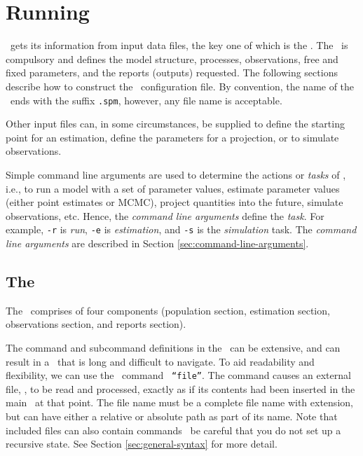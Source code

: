 \section{Running \SPM\label{sec:running-spm}}

\SPM\ gets its information from input data files, the key one of which is the \config{}. The \config\ is compulsory and defines the model structure, processes, observations, free and fixed parameters, and the reports (outputs) requested. The following sections  describe how to construct the \SPM\ configuration file. By convention, the name of the \config\ ends with the suffix \texttt{.spm}, however, any file name is acceptable.

Other input files can, in some circumstances, be supplied to define the starting point for an estimation, define the parameters for a projection, or to simulate observations.  

Simple command line arguments are used to determine the actions or \emph{tasks} of \SPM, i.e., to run a model with a set of parameter values, estimate parameter values (either point estimates or MCMC), project quantities into the future, simulate observations, etc. Hence, the \emph{command line arguments} define the \emph{task}. For example, \texttt{-r} is \emph{run}, \texttt{-e} is \emph{estimation}, and \texttt{-s} is the \emph{simulation} task. The \emph{command line arguments} are described in Section \ref{sec:command-line-arguments}.

\subsection{The \config\label{sec:config-files}}

The \config\ comprises of four components (population section, estimation section, observations section, and reports section). 

The command and subcommand definitions in the \config\ can be extensive, and can result in a \config\ that is long and difficult to navigate. To aid readability and flexibility, we can use the \config\ command  \texttt{ ``file''}. The command causes an external file, , to be read and processed, exactly as if its contents had been inserted in the main \config\ at that point. The file name must be a complete file name with extension, but can have either a relative or absolute path as part of its name. Note that included files can also contain  commands \textemdash\ be careful that you do not set up a recursive state. See Section \ref{sec:general-syntax} for more detail.

